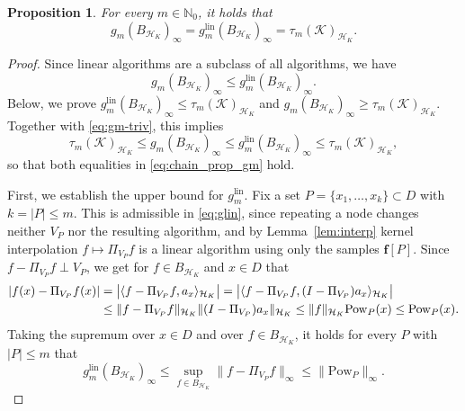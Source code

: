 \documentclass[11pt,reqno, a4paper]{article}
\numberwithin{equation}{section}
\newtheorem{proposition}[theorem]{Proposition}
\newcommand{\N}{\mathbb{N}}
\newcommand{\lin}{\ensuremath{\mathrm{lin}}}
\newcommand{\ip}[2]{\langle #1,#2\rangle}
\newcommand{\norm}[1]{\lVert #1\rVert}
\begin{document}
\begin{proposition}\label{prop:gm}
For every $m\in\N_0$, it holds that
\begin{equation}\label{eq:chain_prop_gm}
    g_m(B_{\mathcal H_K})_\infty = g_m^{\lin}(B_{\mathcal H_K})_\infty = \tau_m(\mathcal{K})_{\mathcal{H}_K}.
\end{equation}
\end{proposition}
 
\begin{proof}
Since linear algorithms are a subclass of all algorithms, we have
\begin{equation}\label{eq:gm-triv}
    g_m(B_{\mathcal H_K})_\infty \le g_m^{\lin}(B_{\mathcal H_K})_\infty.
\end{equation}
Below, we prove $g_m^{\lin}(B_{\mathcal H_K})_\infty\le\tau_m(\mathcal{K})_{\mathcal{H}_K}$ and $g_m(B_{\mathcal H_K})_\infty\ge\tau_m(\mathcal{K})_{\mathcal{H}_K}$.
Together with \eqref{eq:gm-triv}, this implies
\begin{equation}
    \tau_m(\mathcal{K})_{\mathcal{H}_K} \le g_m(B_{\mathcal H_K})_\infty \le g_m^{\lin}(B_{\mathcal H_K})_\infty \le \tau_m(\mathcal{K})_{\mathcal{H}_K},
\end{equation}
so that both equalities in \eqref{eq:chain_prop_gm} hold.
 
First, we establish the upper bound for $g_m^{\lin}$.
Fix a set $P=\{x_1,\dots,x_k\}\subset D$ with $k=|P|\le m$.
This is admissible in \eqref{eq:glin}, since repeating a node changes neither $V_P$ nor the resulting algorithm, and by Lemma~\ref{lem:interp} kernel interpolation $f\mapsto\Pi_{V_P}f$ is a linear algorithm using only the samples $\mathbf f[P]$.
Since $f-\Pi_{V_P}f\perp V_P$, we get for $f\in B_{\mathcal H_K}$ and $x\in D$ that
\begin{align}
    |f(x)-\Pi_{V_P}f(x)| &= \bigl|\ip{f-\Pi_{V_P}f}{a_x}_{\mathcal H_K}\bigr|
    = \bigl|\ip{f-\Pi_{V_P}f}{(I-\Pi_{V_P})a_x}_{\mathcal H_K}\bigr| \notag\\
    & \le \norm{f-\Pi_{V_P}f}_{\mathcal H_K} \norm{ (I-\Pi_{V_P})a_x  }_{\mathcal H_K}\le \norm{f}_{\mathcal H_K} \mathrm{Pow}_P(x) \le \mathrm{Pow}_P(x).
\end{align}
Taking the supremum over $x\in D$ and over $f\in B_{\mathcal H_K}$, it holds for every $P$ with $|P|\le m$ that
\begin{equation}
    g_m^{\lin}(B_{\mathcal H_K})_\infty \le
    \sup_{f\in B_{\mathcal H_K}}\norm{f-\Pi_{V_P}f}_\infty \le \norm{\mathrm{Pow}_P}_\infty.
\end{equation}
 

\end{proof}
\end{document}
